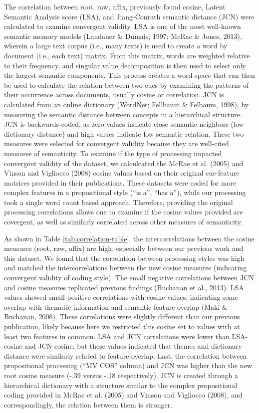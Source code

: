 \documentclass[english,,man]{apa6}
\theoremstyle{definition}
\theoremstyle{definition}
\theoremstyle{definition}
\theoremstyle{remark}
\begin{document}
The correlation between root, raw, affix, previously found cosine,
Latent Semantic Analysis score (LSA), and Jiang-Conrath semantic
distance (JCN) were calculated to examine convergent validity. LSA is
one of the most well-known semantic memory models (Landauer \& Dumais,
1997; McRae \& Jones, 2013), wherein a large text corpus (i.e., many
texts) is used to create a word by document (i.e., each text) matrix.
From this matrix, words are weighted relative to their frequency, and
singular value decomposition is then used to select only the largest
semantic components. This process creates a word space that can then be
used to calculate the relation between two cues by examining the
patterns of their occurrence across documents, usually cosine or
correlation. JCN is calculated from an online dictionary (WordNet;
Fellbaum \& Felbaum, 1998), by measuring the semantic distance between
concepts in a hierarchical structure. JCN is backwards coded, as zero
values indicate close semantic neighbors (low dictionary distance) and
high values indicate low semantic relation. These two measures were
selected for convergent validity because they are well-cited measures of
semanticity. To examine if the type of processing impacted convergent
validity of the dataset, we calculcated the McRae et al. (2005) and
Vinson and Vigliocco (2008) cosine values based on their original
cue-feature matrices provided in their publications. These datasets were
coded for more complex features in a propositional style (\enquote{is
a}, \enquote{has a}), while our processing took a single word count
based approach. Therefore, providing the original processing
correlations allows one to examine if the cosine values provided are
covergent, as well as similarly correlated across other measures of
semanticity.

As shown in Table \ref{tab:correlation-table}, the intercorrelations
between the cosine measures (root, raw, affix) are high, especially
between our previous work and this dataset. We found that the
correlation between processing styles was high and matched the
intercorrelations between the new cosine measures (indicating convergent
validity of coding style). The small negative correlations between JCN
and cosine measures replicated previous findings (Buchanan et al.,
2013). LSA values showed small positive correlations with cosine values,
indicating some overlap with thematic information and semantic feature
overlap (Maki \& Buchanan, 2008). These correlations were slightly
different than our previous publication, likely because here we
restricted this cosine set to values with at least two features in
common. LSA and JCN correlations were lower than LSA-cosine and
JCN-cosine, but these values indicated that themes and dictionary
distance were similarly related to feature overlap. Last, the
correlation between propositional processing (\enquote{MV COS} column)
and JCN was higher than the new root cosine measure (-.39 versus -.18
respectively). JCN is created through a hierarchical dictionary with a
structure similar to the complex propositional coding provided in McRae
et al. (2005) and Vinson and Vigliocco (2008), and correspondingly, the
relation between them is stronger.
\end{document}
